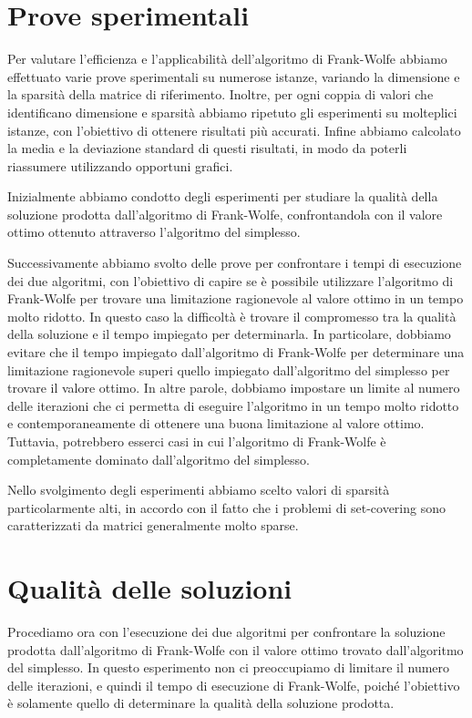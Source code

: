 \section{Prove sperimentali}
Per valutare l'efficienza e l'applicabilità dell'algoritmo di Frank-Wolfe abbiamo effettuato varie prove sperimentali su
numerose istanze, variando la dimensione e la sparsità della matrice di riferimento. Inoltre, per ogni coppia di valori
che identificano dimensione e sparsità abbiamo ripetuto gli esperimenti su molteplici istanze, con l'obiettivo di
ottenere risultati più accurati. Infine abbiamo calcolato la media e la deviazione standard di questi risultati, in modo
da poterli riassumere utilizzando opportuni grafici.

Inizialmente abbiamo condotto degli esperimenti per studiare la qualità della soluzione prodotta dall'algoritmo di
Frank-Wolfe, confrontandola con il valore ottimo ottenuto attraverso l'algoritmo del simplesso.

Successivamente abbiamo svolto delle prove per confrontare i tempi di esecuzione dei due algoritmi, con l'obiettivo di
capire se è possibile utilizzare l'algoritmo di Frank-Wolfe per trovare una limitazione ragionevole al valore ottimo in
un tempo molto ridotto. In questo caso la difficoltà è trovare il compromesso tra la qualità della soluzione e il tempo
impiegato per determinarla. In particolare, dobbiamo evitare che il tempo impiegato dall'algoritmo di Frank-Wolfe per
determinare una limitazione ragionevole superi quello impiegato dall'algoritmo del simplesso per trovare il valore
ottimo. In altre parole, dobbiamo impostare un limite al numero delle iterazioni che ci permetta di eseguire l'algoritmo
in un tempo molto ridotto e contemporaneamente di ottenere una buona limitazione al valore ottimo. Tuttavia, potrebbero
esserci casi in cui l'algoritmo di Frank-Wolfe è completamente dominato dall'algoritmo del simplesso.

Nello svolgimento degli esperimenti abbiamo scelto valori di sparsità particolarmente alti, in accordo con il fatto che
i problemi di set-covering sono caratterizzati da matrici generalmente molto sparse.

\section{Qualità delle soluzioni}
Procediamo ora con l'esecuzione dei due algoritmi per confrontare la soluzione prodotta dall'algoritmo di Frank-Wolfe
con il valore ottimo trovato dall'algoritmo del simplesso. In questo esperimento non ci preoccupiamo di
limitare il numero delle iterazioni, e quindi il tempo di esecuzione di Frank-Wolfe, poiché l'obiettivo è solamente quello
di determinare la qualità della soluzione prodotta.


